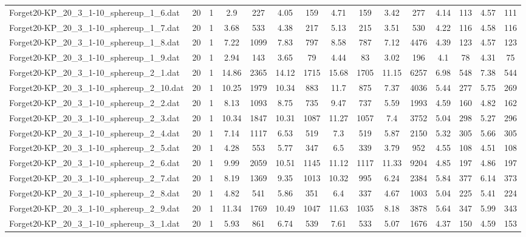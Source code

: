 \begin{table}[!ht]
{\begin{tabular}{lcccccccccccccc}
Forget20-KP\_20\_3\_1-10\_sphereup\_1\_6.dat & 20 & 1 & 2.9 & 227 & 4.05 & 159 & 4.71 & 159 & 3.42 & 277 & 4.14 & 113 & 4.57 & 111 \\
Forget20-KP\_20\_3\_1-10\_sphereup\_1\_7.dat & 20 & 1 & 3.68 & 533 & 4.38 & 217 & 5.13 & 215 & 3.51 & 530 & 4.22 & 116 & 4.58 & 116 \\
Forget20-KP\_20\_3\_1-10\_sphereup\_1\_8.dat & 20 & 1 & 7.22 & 1099 & 7.83 & 797 & 8.58 & 787 & 7.12 & 4476 & 4.39 & 123 & 4.57 & 123 \\
Forget20-KP\_20\_3\_1-10\_sphereup\_1\_9.dat & 20 & 1 & 2.94 & 143 & 3.65 & 79 & 4.44 & 83 & 3.02 & 196 & 4.1 & 78 & 4.31 & 75 \\
Forget20-KP\_20\_3\_1-10\_sphereup\_2\_1.dat & 20 & 1 & 14.86 & 2365 & 14.12 & 1715 & 15.68 & 1705 & 11.15 & 6257 & 6.98 & 548 & 7.38 & 544 \\
Forget20-KP\_20\_3\_1-10\_sphereup\_2\_10.dat & 20 & 1 & 10.25 & 1979 & 10.34 & 883 & 11.7 & 875 & 7.37 & 4036 & 5.44 & 277 & 5.75 & 269 \\
Forget20-KP\_20\_3\_1-10\_sphereup\_2\_2.dat & 20 & 1 & 8.13 & 1093 & 8.75 & 735 & 9.47 & 737 & 5.59 & 1993 & 4.59 & 160 & 4.82 & 162 \\
Forget20-KP\_20\_3\_1-10\_sphereup\_2\_3.dat & 20 & 1 & 10.34 & 1847 & 10.31 & 1087 & 11.27 & 1057 & 7.4 & 3752 & 5.04 & 298 & 5.27 & 296 \\
Forget20-KP\_20\_3\_1-10\_sphereup\_2\_4.dat & 20 & 1 & 7.14 & 1117 & 6.53 & 519 & 7.3 & 519 & 5.87 & 2150 & 5.32 & 305 & 5.66 & 305 \\
Forget20-KP\_20\_3\_1-10\_sphereup\_2\_5.dat & 20 & 1 & 4.28 & 553 & 5.77 & 347 & 6.5 & 339 & 3.79 & 952 & 4.55 & 108 & 4.51 & 108 \\
Forget20-KP\_20\_3\_1-10\_sphereup\_2\_6.dat & 20 & 1 & 9.99 & 2059 & 10.51 & 1145 & 11.12 & 1117 & 11.33 & 9204 & 4.85 & 197 & 4.86 & 197 \\
Forget20-KP\_20\_3\_1-10\_sphereup\_2\_7.dat & 20 & 1 & 8.19 & 1369 & 9.35 & 1013 & 10.32 & 995 & 6.24 & 2384 & 5.84 & 377 & 6.14 & 373 \\
Forget20-KP\_20\_3\_1-10\_sphereup\_2\_8.dat & 20 & 1 & 4.82 & 541 & 5.86 & 351 & 6.4 & 337 & 4.67 & 1003 & 5.04 & 225 & 5.41 & 224 \\
Forget20-KP\_20\_3\_1-10\_sphereup\_2\_9.dat & 20 & 1 & 11.34 & 1769 & 10.49 & 1047 & 11.63 & 1035 & 8.18 & 3878 & 5.64 & 347 & 5.99 & 343 \\
Forget20-KP\_20\_3\_1-10\_sphereup\_3\_1.dat & 20 & 1 & 5.93 & 861 & 6.74 & 539 & 7.61 & 533 & 5.07 & 1676 & 4.37 & 150 & 4.59 & 153 \\

\end{tabular}}
\end{table}
